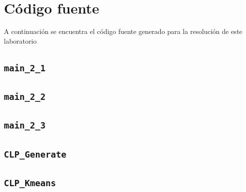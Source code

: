 \documentclass[11pt]{article} %
\begin{document}
\clearpage

\section{Código fuente}
\label{sec:src_code}

A continuación se encuentra el código fuente generado para la resolución de
este laboratorio

\subsection{\texttt{main\_2\_1}}
\label{src:main:21}



\subsection{\texttt{main\_2\_2}}
\label{src:main:22}



\clearpage

\subsection{\texttt{main\_2\_3}}
\label{src:main:23}



\clearpage

\subsection{\texttt{CLP\_Generate}}
\label{src:fun:generate}



\clearpage

\subsection{\texttt{CLP\_Kmeans}}
\label{src:fun:kmeans}


\end{document}
